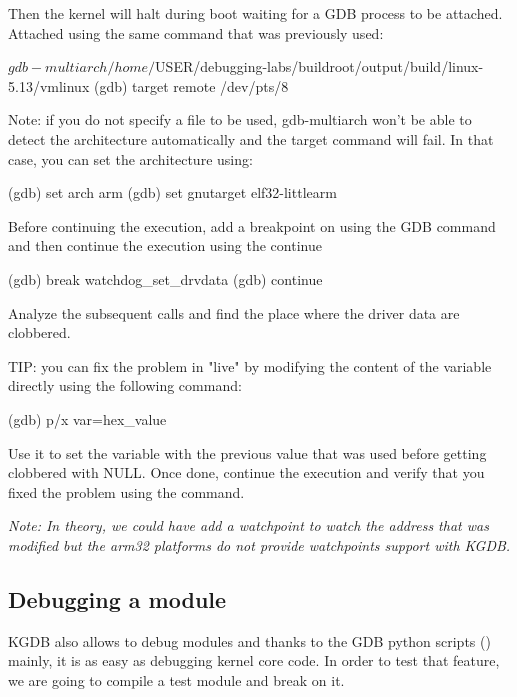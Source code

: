 Then the kernel will halt during boot waiting for a GDB process to be attached.
Attached using the same command that was previously used:

\begin{bashinput}
$ gdb-multiarch /home/$USER/debugging-labs/buildroot/output/build/linux-5.13/vmlinux
(gdb) target remote /dev/pts/8
\end{bashinput}

Note: if you do not specify a file to be used, gdb-multiarch won't be able to
detect the architecture automatically and the target command will fail. In that
case, you can set the architecture using:

\begin{bashinput}
(gdb) set arch arm
(gdb) set gnutarget elf32-littlearm
\end{bashinput}

Before continuing the execution, add a breakpoint on
 using the  GDB command and then
continue the execution using the continue 

\begin{bashinput}
(gdb) break watchdog_set_drvdata
(gdb) continue
\end{bashinput}

Analyze the subsequent calls and find the place where the driver data are
clobbered.

TIP: you can fix the problem in "live" by modifying the content of the
 variable directly using the following command:

\begin{bashinput}
(gdb) p/x var=hex_value
\end{bashinput}

Use it to set the variable with the previous value that was used before getting
clobbered with NULL. Once done, continue the execution and verify that you fixed
the problem using the  command.

{\em Note: In theory, we could have add a watchpoint to watch the address that
was modified but the arm32 platforms do not provide watchpoints support with
KGDB.}

\subsection{Debugging a module}

KGDB also allows to debug modules and thanks to the GDB python scripts
() mainly, it is as easy as debugging kernel core code. In
order to test that feature, we are going to compile a test module and break on
it.

